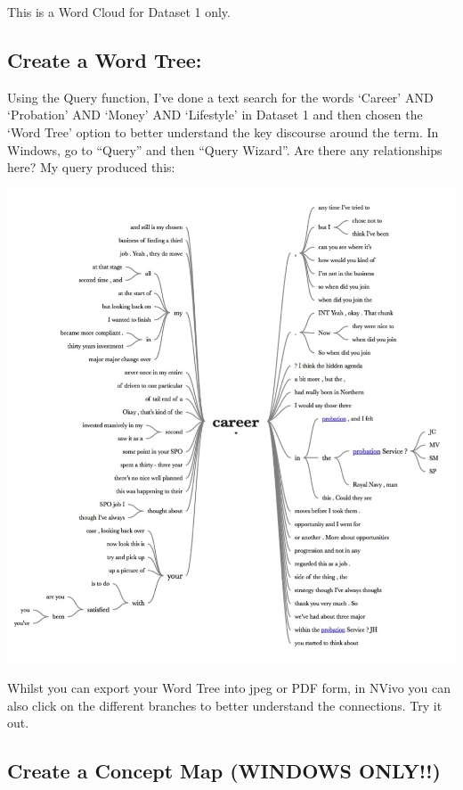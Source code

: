 \documentclass[]{book}
\theoremstyle{definition}
\theoremstyle{definition}
\theoremstyle{definition}
\theoremstyle{remark}
\begin{document}
This is a Word Cloud for Dataset 1 only.

\hypertarget{create-a-word-tree}{%
\subsection{Create a Word Tree:}\label{create-a-word-tree}}

Using the Query function, I've done a text search for the words `Career'
AND `Probation' AND `Money' AND `Lifestyle' in Dataset 1 and then chosen
the `Word Tree' option to better understand the key discourse around the
term. In Windows, go to ``Query'' and then ``Query Wizard''. Are there
any relationships here? My query produced this:

\includegraphics{imgs/qual_55.png}

Whilst you can export your Word Tree into jpeg or PDF form, in NVivo you
can also click on the different branches to better understand the
connections. Try it out.

\hypertarget{create-a-concept-map-windows-only}{%
\subsection{Create a Concept Map (WINDOWS
ONLY!!)}\label{create-a-concept-map-windows-only}}
\end{document}
